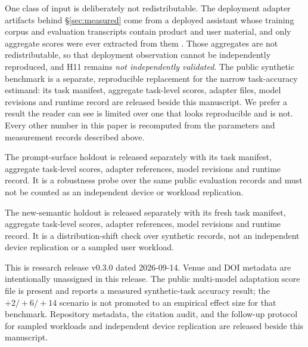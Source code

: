 \documentclass[conference]{IEEEtran}
\begin{document}
One class of input is deliberately not redistributable. The deployment adapter
artifacts behind \S\ref{sec:measured} come from a deployed assistant whose
training corpus and evaluation transcripts contain product and user material,
and only aggregate scores were ever extracted from them
\cite{autoyou_support2026}. Those aggregates are not redistributable, so that
deployment observation cannot be independently reproduced, and H11 remains
\emph{not independently validated}. The public synthetic benchmark is a
separate, reproducible replacement for the narrow task-accuracy estimand: its
task manifest, aggregate task-level scores, adapter files, model revisions and
runtime record are released beside this manuscript. We prefer a result the
reader can see is limited over one that looks reproducible and is not. Every
other number in this paper is recomputed from the parameters and measurement
records described above.

The prompt-surface holdout is released separately with its task manifest,
aggregate task-level scores, adapter references, model revisions and runtime
record. It is a robustness probe over the same public evaluation records and
must not be counted as an independent device or workload replication.

The new-semantic holdout is released separately with its fresh task manifest,
aggregate task-level scores, adapter references, model revisions and runtime
record. It is a distribution-shift check over synthetic records, not an
independent device replication or a sampled user workload.

This is research release v0.3.0 dated 2026-09-14. Venue and DOI metadata are
intentionally unassigned in this release. The public multi-model adaptation
score file is present and reports a measured synthetic-task accuracy result;
the $+2/+6/+14$ scenario is not promoted to an empirical effect size for that
benchmark. Repository metadata, the citation audit, and the follow-up protocol
for sampled workloads and independent device replication are released beside
this manuscript.



\end{document}
